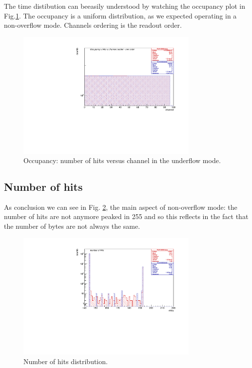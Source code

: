 The time distibution can beeasily understood by watching the occupancy plot in Fig.\ref{fig:5}. The occupancy is a uniform distribution, as we expected operating in a non-overflow mode. Channels ordering is the readout order.
\begin{figure}[!h]
\centering
\includegraphics[width =0.8\textwidth]{figures/pdf/figure_00002_nhitsvschannel_roc_simulation_2}
\caption{Occupancy: number of hits versus channel in the underflow mode.}
\label{fig:5}
\end{figure}

\subsection{Number of hits}
As conclusion we can see in Fig. \ref{fig:6}, the main aspect of non-overflow mode: the number of hits are not anymore peaked in 255 and so this reflects in the fact that the number of bytes are not always the same.
\begin{figure}[!h]
\centering
\includegraphics[width =0.8\textwidth]{figures/pdf/figure_00009_nhits_105038}
\caption{Number of hits distribution.}
\label{fig:6}
\end{figure}










